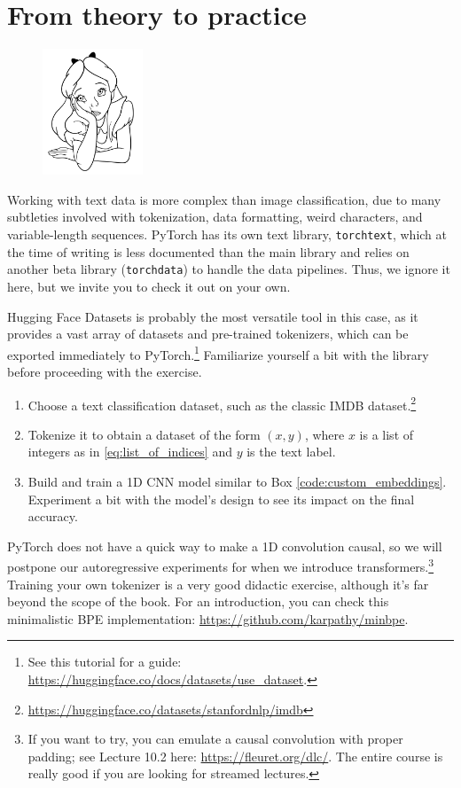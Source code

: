 \section*{From theory to practice}

\begin{figure}
\vspace{-3em}\includegraphics[width=3.0cm]{images/shutterstock_2075221579.jpg}
\vspace{-2em}
\end{figure}

Working with text data is more complex than image classification, due to many subtleties involved with tokenization, data formatting, weird characters, and variable-length sequences. PyTorch has its own text library, \texttt{torchtext}, which at the time of writing is less documented than the main library and relies on another beta library (\texttt{torchdata}) to handle the data pipelines. Thus, we ignore it here, but we invite you to check it out on your own.

Hugging Face Datasets is probably the most versatile tool in this case, as it provides a vast array of datasets and pre-trained tokenizers, which can be exported immediately to PyTorch.\footnote{See this tutorial for a guide: \url{https://huggingface.co/docs/datasets/use_dataset}.} Familiarize yourself a bit with the library before proceeding with the exercise.

\begin{enumerate}
\item Choose a text classification dataset, such as the classic IMDB dataset.\footnote{\url{https://huggingface.co/datasets/stanfordnlp/imdb}} 
\item Tokenize it to obtain a dataset of the form $(x,y)$, where $x$ is a list of integers as in \eqref{eq:list_of_indices} and $y$ is the text label.
\item Build and train a 1D CNN model similar to Box \ref{code:custom_embeddings}. Experiment a bit with the model's design to see its impact on the final accuracy.
\end{enumerate}

PyTorch does not have a quick way to make a 1D convolution causal, so we will postpone our autoregressive experiments for when we introduce transformers.\footnote{If you want to try, you can emulate a causal convolution with proper padding; see Lecture 10.2 here: \url{https://fleuret.org/dlc/}. The entire course is really good if you are looking for streamed lectures.} Training your own tokenizer is a very good didactic exercise, although it's far beyond the scope of the book. For an introduction, you can check this minimalistic BPE implementation: \url{https://github.com/karpathy/minbpe}.